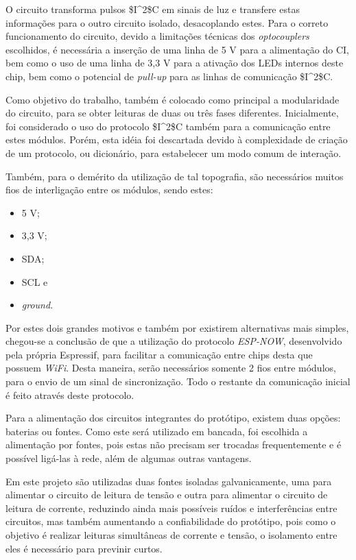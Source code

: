 O circuito transforma pulsos \gls{$I^2$C} em sinais de luz e transfere estas informações para o outro circuito isolado, desacoplando estes. Para o correto funcionamento do circuito, devido a limitações técnicas dos \textit{optocouplers} escolhidos, é necessária a inserção de uma linha de 5 V para a alimentação do \gls{CI}, bem como o uso de uma linha de 3,3 V para a ativação dos LEDs internos deste chip, bem como o potencial de \textit{pull-up} para as linhas de comunicação \gls{$I^2$C}.

Como objetivo do trabalho, também é colocado como principal a modularidade do circuito, para se obter leituras de duas ou três fases diferentes. Inicialmente, foi considerado o uso do protocolo \gls{$I^2$C} também para a comunicação entre estes módulos. Porém, esta idéia foi descartada devido à complexidade de criação de um protocolo, ou dicionário, para estabelecer um modo comum de interação.

Também, para o demérito da utilização de tal topografia, são necessários muitos fios de interligação entre os módulos, sendo estes:

\begin{itemize}
    \item 5 V;
    \item 3,3 V;
    \item SDA;
    \item SCL e
    \item \textit{ground}.
\end{itemize}

Por estes dois grandes motivos e também por existirem alternativas mais simples, chegou-se a conclusão de que a utilização do protocolo \textit{ESP-NOW}, desenvolvido pela própria Espressif, para facilitar a comunicação entre chips desta que possuem \textit{WiFi}. Desta maneira, serão necessários somente 2 fios entre módulos, para o envio de um sinal de sincronização. Todo o restante da comunicação inicial é feito através deste protocolo.

Para a alimentação dos circuitos integrantes do protótipo, existem duas opções: baterias ou fontes. Como este será utilizado em bancada, foi escolhida a alimentação por fontes, pois estas não precisam ser trocadas frequentemente e é possível ligá-las à rede, além de algumas outras vantagens.

Em este projeto são utilizadas duas fontes isoladas galvanicamente, uma para alimentar o circuito de leitura de tensão e outra para alimentar o circuito de leitura de corrente, reduzindo ainda mais possíveis ruídos e interferências entre circuitos, mas também aumentando a confiabilidade do protótipo, pois como o objetivo é realizar leituras simultâneas de corrente e tensão, o isolamento entre eles é necessário para previnir curtos.


